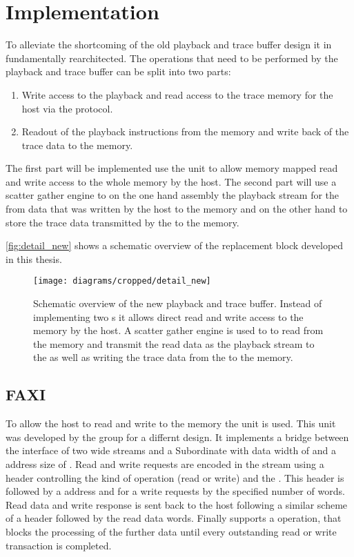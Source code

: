 \section{Implementation}
To alleviate the shortcoming of the old playback and trace buffer design it in fundamentally rearchitected.
The operations that need to be performed by the playback and trace buffer can be split into two parts:
\begin{enumerate}
  \item Write access to the playback and read access to the trace memory for the host via the \HostARQ{} protocol.
  \item Readout of the playback instructions from the memory and write back of the trace data to the memory.
\end{enumerate}
The first part will be implemented use the \FAXI{} unit to allow memory mapped read and write access to the whole \DDR{} memory by the host.
The second part will use a scatter gather \DMA{} engine to on the one hand assembly the playback stream for the \pbexec{} from data that was written by the host to the \DDR{} memory and on the other hand to store the trace data transmitted by the \pbexec{} to the \DDR{} memory.

\autoref{fig:detail_new} shows a schematic overview of the replacement block developed in this thesis.

\begin{figure}[htbp]
\centerline{\texttt{[image: diagrams/cropped/detail\_new]}}
\caption{Schematic overview of the new playback and trace buffer. Instead of implementing two \FIFO{}s it allows direct read and write access to the \DDR{} memory by the host. A scatter gather \DMA{} engine is used to to read from the \DDR{} memory and transmit the read data as the playback stream to the \pbexec{} as well as writing the trace data from the \pbexec{} to the \DDR{} memory.}\label{fig:detail_new}
\end{figure}

\subsection{FAXI}
To allow the host to read and write to the \DDR{} memory the \FAXI{} unit is used. This unit was developed by the group for a differnt \FPGA{} design. It implements a bridge between the \HostARQ{} \FPGA{} interface of two \PhyWordSize{} wide streams and a \AXI{} Subordinate with data width of \PhyWordSize{} and a address size of \PhyWordSize{}.
Read and write requests are encoded in the \HostARQ{} stream using a \PhyWordSize{} header controlling the kind of operation (read or write) and the \burstsize{}. This header is followed by a \PhyWordSize{} address and for a write requests by the specified number of \PhyWordSize{} words.
Read data and write response is sent back to the host following a similar scheme of a \PhyWordSize{} header followed by the read data words.
Finally \FAXI{} supports a \globalfence{} operation, that blocks the processing of the further data until every outstanding read or write transaction is completed.

